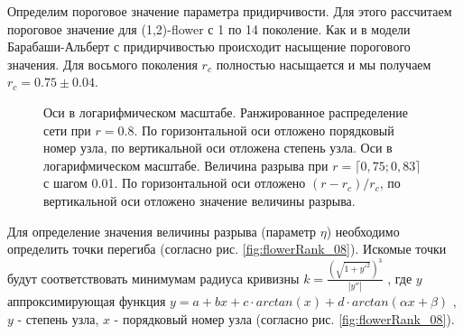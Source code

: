 \documentclass[10pt,aps,pra]{revtex4-1}
\begin{document}
        Определим пороговое значение параметра придирчивости. Для этого рассчитаем пороговое значение для (1,2)-flower с 1 по 14 поколение. Как и в модели Барабаши-Альберт с придирчивостью происходит насыщение порогового значения. Для восьмого поколения $r_c$ полностью насыщается и мы получаем $r_c=0.75 \pm 0.04$. 

            \begin{figure}[H]  
                \centering

                \caption{
                    \label{fig:flowerRank}
                     Оси в логарифмическом масштабе. Ранжированное распределение сети при $r=0.8$. По горизонтальной оси отложено порядковый номер узла, по вертикальной оси отложена степень узла.
                     Оси в логарифмическом масштабе. Величина разрыва при $r=\lceil 0,75; 0,83 \rceil$ с шагом 0.01. По горизонтальной оси отложено $(r-r_c)/r_c$, по вертикальной оси отложено значение величины разрыва.
                }
            \end{figure}

        Для определение значения величины разрыва (параметр $\eta$) необходимо определить точки перегиба (согласно рис. \ref{fig:flowerRank_08}). Искомые точки будут соответствовать минимумам радиуса кривизны $k=\frac{(\sqrt{1+y'^2})^3}{|y''|}$ \cite{Hazewinkel}, где $y$ аппроксимирующая функция $y=a+bx+c \cdot arctan(x) + d \cdot arctan(\alpha x + \beta)$ \cite{Mills}, $y$ - степень узла, $x$ - порядковый номер узла (согласно рис. \ref{fig:flowerRank_08}).
\end{document}
